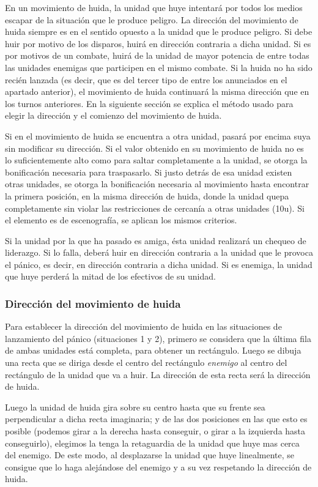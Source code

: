 En un movimiento de huida, la unidad que huye intentará por todos los
medios escapar de la situación que le produce peligro. La dirección
del movimiento de huida siempre es en el sentido opuesto a la unidad
que le produce peligro. Si debe huir por motivo de los disparos,
huirá en dirección contraria a dicha unidad. Si es por motivos de un
combate, huirá de la unidad de mayor potencia de entre todas las
unidades enemigas que participen en el mismo combate. Si la huida no
ha sido recién lanzada (es decir, que es del tercer tipo de entre los
anunciados en el apartado anterior), el movimiento de huida continuará
la misma dirección que en los turnos anteriores. En la siguiente
sección se explica el método usado para elegir la dirección y el
comienzo del movimiento de huida.

Si en el movimiento de huida se encuentra a otra unidad, pasará por
encima suya sin modificar su dirección. Si el valor obtenido en su movimiento de huida no
es lo suficientemente alto como para saltar completamente a la unidad,
se otorga la bonificación necesaria para traspasarlo. Si justo detrás
de esa unidad existen otras unidades, se otorga la bonificación
necesaria al movimiento hasta encontrar la primera posición, en la
misma dirección de huida, donde la unidad quepa completamente sin
violar las restricciones de cercanía a otras unidades (10u). Si el
elemento es de escenografía, se aplican los mismos criterios.

Si la unidad por la que ha pasado es amiga, ésta unidad realizará un
chequeo de liderazgo. Si lo falla, deberá huir en dirección contraria
a la unidad que le provoca el pánico, es decir, en dirección contraria
a dicha unidad. Si es enemiga, la unidad que huye perderá la mitad de
los efectivos de su unidad.

\subsubsection*{Dirección del movimiento de huida}
\label{direccionhuida}
Para establecer la dirección del movimiento de huida en las
situaciones de lanzamiento del pánico (situaciones 1 y 2), primero se
considera que la última fila de ambas unidades está completa, para
obtener un rectángulo. Luego se dibuja una recta que se diriga desde
el centro del rectángulo \emph{enemigo} al centro del rectángulo de la
unidad que va a huir. La dirección de esta recta será la dirección de huida.

Luego la unidad de huida gira sobre su centro hasta que su frente sea
perpendicular a dicha recta imaginaria; y de las dos posiciones en las
que esto es posible (podemos girar a la derecha hasta conseguir, o
girar a la izquierda hasta conseguirlo), elegimos la tenga la
retaguardia de la unidad que huye mas cerca del enemigo. De este modo,
al desplazarse la unidad que huye linealmente, se consigue que lo haga alejándose del
enemigo y a su vez respetando la dirección de huida.

